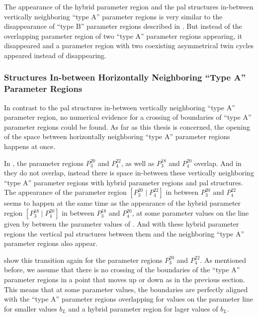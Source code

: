 The appearance of the hybrid parameter region and the \gls{pal} structures in-between vertically neighboring ``type A'' parameter regions is very similar to the disappearance of ``type B'' parameter regions described in .
But instead of the overlapping parameter region of two ``type A'' parameter regions appearing, it disappeared and a parameter region with two coexisting asymmetrical twin cycles appeared instead of disappearing.

\subsubsection{ Structures In-between Horizontally Neighboring ``Type A'' Parameter Regions}
\label{sec:add.change.appa.vert}

In contrast to the \gls{pal} structures in-between vertically neighboring ``type A'' parameter region, no numerical evidence for a crossing of boundaries of ``type A'' parameter regions could be found.
As far as this thesis is concerned, the opening of the space between horizontally neighboring ``type A'' parameter regions happens at once.

In , the parameter regions $P^{20}_3$ and $P^{22}_4$, as well as $P^{18}_3$ and $P^{20}_4$ overlap.
And in  they do not overlap, instead there is space in-between these vertically neighboring ``type A'' parameter regions with hybrid parameter regions and \gls{pal} structures.
The appearance of the parameter region $\left[P^{20}_3 \mid P^{22}_4\right]$ in between $P^{20}_3$ and $P^{22}_4$ seems to happen at the same time as the appearance of the hybrid parameter region $\left[P^{18}_3 \mid P^{20}_4\right]$ in between $P^{18}_3$ and $P^{20}_4$, at some parameter values on the line given by  between the parameter values of .
And with these hybrid parameter regions the vertical \gls{pal} structures between them and the neighboring ``type A'' parameter regions also appear.

 show this transition again for the parameter regions $P^{20}_3$ and $P^{22}_4$.
As mentioned before, we assume that there is no crossing of the boundaries of the ``type A'' parameter regions in a point that moves up or down as in the previous section.
This means that at some parameter values, the boundaries are perfectly aligned with the ``type A'' parameter regions overlapping for values on the parameter line for smaller values $b_L$ and a hybrid parameter region for lager values of $b_L$.

